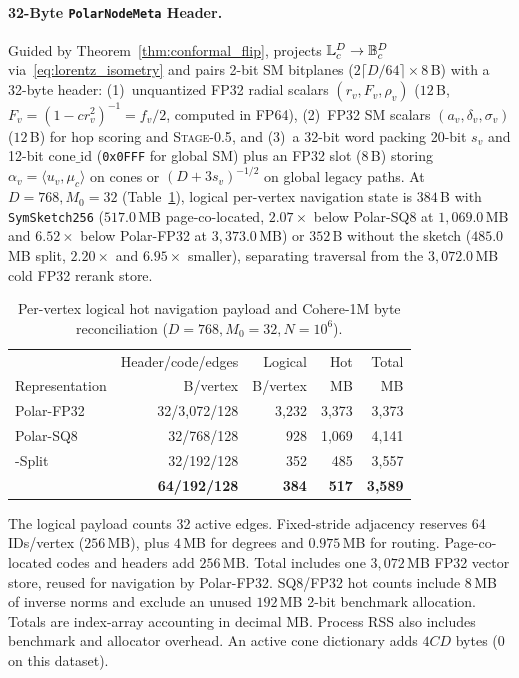 \paragraph{32-Byte \texttt{PolarNodeMeta} Header.}
Guided by Theorem~\ref{thm:conformal_flip}, \rquiver{} projects $\mathbb{L}_c^D \to \mathbb{B}_c^D$ via~\eqref{eq:lorentz_isometry} and pairs 2-bit {SM} bitplanes ($2\lceil D / 64\rceil \times 8$\,B) with a 32-byte header:
(1)~unquantized FP32 radial scalars $(r_v, F_v, \rho_v)$ ($12$\,B, $F_v = (1 - c r_v^2)^{-1} = f_v/2$, computed in FP64),
(2)~FP32 {SM} scalars $(a_v, \delta_v, \sigma_v)$ ($12$\,B) for hop scoring and \textsc{Stage-0.5}, and
(3)~a 32-bit word packing 20-bit $s_v$ and 12-bit $\text{cone\_id}$ (\texttt{0x0FFF} for global {SM}) plus an FP32 slot ($8$\,B) storing $\alpha_v = \langle u_v, \mu_c\rangle$ on cones or $(D + 3 s_v)^{-1/2}$ on global legacy paths.
At $D = 768, M_0 = 32$ (Table~\ref{tab:node_layout}), logical per-vertex navigation state is $384$\,B with \texttt{SymSketch256} ($517.0$\,MB page-co-located, $2.07\times$ below {Polar-SQ8} at $1{,}069.0$\,MB and $6.52\times$ below {Polar-FP32} at $3{,}373.0$\,MB) or $352$\,B without the sketch ($485.0$\,MB split, $2.20\times$ and $6.95\times$ smaller), separating traversal from the $3{,}072.0$\,MB cold FP32 rerank store.

\begin{table}[t]
  \centering
  \caption{Per-vertex logical hot navigation payload and {Cohere-1M} byte reconciliation ($D=768, M_0=32, N=10^6$).}
  \label{tab:node_layout}
  \footnotesize
  \setlength{\tabcolsep}{3.5pt}
  \begin{tabularx}{\linewidth}{@{}>{\raggedright\arraybackslash}Xrrrr@{}}
    \toprule
    & Header/code/edges & Logical & Hot & Total \\
    Representation & B/vertex & B/vertex & MB & MB \\
    \midrule
    Polar-FP32 & 32/3,072/128 & 3,232 & 3,373 & 3,373 \\
    Polar-SQ8 & 32/768/128 & 928 & 1,069 & 4,141 \\
    \rquiver{}-Split & 32/192/128 & 352 & 485 & 3,557 \\
    \textbf{\rquiver{}} & \textbf{64/192/128} & \textbf{384} & \textbf{517} & \textbf{3,589} \\
    \bottomrule
  \end{tabularx}
  \par\smallskip
  {\scriptsize\raggedright The logical payload counts 32 active edges. Fixed-stride adjacency reserves 64 IDs/vertex ($256$\,MB), plus $4$\,MB for degrees and $0.975$\,MB for routing. Page-co-located codes and headers add $256$\,MB. Total includes one $3{,}072$\,MB FP32 vector store, reused for navigation by Polar-FP32. SQ8/FP32 hot counts include $8$\,MB of inverse norms and exclude an unused $192$\,MB 2-bit benchmark allocation. Totals are index-array accounting in decimal MB. Process RSS also includes benchmark and allocator overhead. An active cone dictionary adds $4CD$ bytes ($0$ on this dataset).\par}
\end{table}

